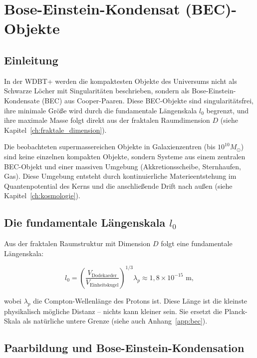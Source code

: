
\chapter{Bose-Einstein-Kondensat (BEC)-Objekte}
\label{ch:bec_objekte}

\section{Einleitung}
\label{sec:bec_einleitung}

In der WDBT+ werden die kompaktesten Objekte des Universums nicht als Schwarze Löcher mit Singularitäten beschrieben, sondern als Bose-Einstein-Kondensate (BEC) aus Cooper-Paaren. Diese BEC-Objekte sind singularitätsfrei, ihre minimale Größe wird durch die fundamentale Längenskala \( l_0 \) begrenzt, und ihre maximale Masse folgt direkt aus der fraktalen Raumdimension \( D \) (siehe Kapitel~\ref{ch:fraktale_dimension}).

Die beobachteten supermassereichen Objekte in Galaxienzentren (bis \( 10^{10} M_\odot \)) sind keine einzelnen kompakten Objekte, sondern Systeme aus einem zentralen BEC-Objekt und einer massiven Umgebung (Akkretionsscheibe, Sternhaufen, Gas). Diese Umgebung entsteht durch kontinuierliche Materieentstehung im Quantenpotential des Kerns und die anschließende Drift nach außen (siehe Kapitel~\ref{ch:kosmologie}).

\section{Die fundamentale Längenskala \( l_0 \)}
\label{sec:bec_l0}

Aus der fraktalen Raumstruktur mit Dimension \( D \) folgt eine fundamentale Längenskala:

\[
l_0 = \left( \frac{V_{\text{Dodekaeder}}}{V_{\text{Einheitskugel}}} \right)^{1/3} \lambda_p \approx 1,8 \times 10^{-15} \text{ m},
\]

wobei \( \lambda_p \) die Compton-Wellenlänge des Protons ist. Diese Länge ist die kleinste physikalisch mögliche Distanz – nichts kann kleiner sein. Sie ersetzt die Planck-Skala als natürliche untere Grenze (siehe auch Anhang~\ref{app:bec}).

\section{Paarbildung und Bose-Einstein-Kondensation}
\label{sec:bec_paarbildung}

